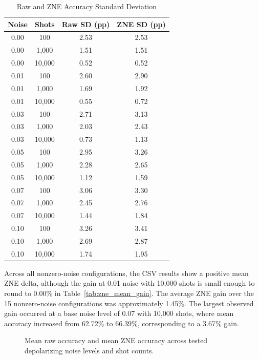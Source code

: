 \documentclass[conference]{IEEEtran}
\begin{document}
\begin{table}[H]
\caption{Raw and ZNE Accuracy Standard Deviation}
\label{tab:zne_standard_deviation}
\centering
\scriptsize
\renewcommand{\arraystretch}{1.35}
\setlength{\tabcolsep}{14pt}
\begin{tabular}{|c|c|c|c|}
\hline
\textbf{Noise} & \textbf{Shots} & \textbf{Raw SD (pp)} & \textbf{ZNE SD (pp)} \\
\hline
0.00 & 100    & 2.53 & 2.53 \\
\hline
0.00 & 1,000  & 1.51 & 1.51 \\
\hline
0.00 & 10,000 & 0.52 & 0.52 \\
\hline
0.01 & 100    & 2.60 & 2.90 \\
\hline
0.01 & 1,000  & 1.69 & 1.92 \\
\hline
0.01 & 10,000 & 0.55 & 0.72 \\
\hline
0.03 & 100    & 2.71 & 3.13 \\
\hline
0.03 & 1,000  & 2.03 & 2.43 \\
\hline
0.03 & 10,000 & 0.73 & 1.13 \\
\hline
0.05 & 100    & 2.95 & 3.26 \\
\hline
0.05 & 1,000  & 2.28 & 2.65 \\
\hline
0.05 & 10,000 & 1.12 & 1.59 \\
\hline
0.07 & 100    & 3.06 & 3.30 \\
\hline
0.07 & 1,000  & 2.45 & 2.76 \\
\hline
0.07 & 10,000 & 1.44 & 1.84 \\
\hline
0.10 & 100    & 3.26 & 3.41 \\
\hline
0.10 & 1,000  & 2.69 & 2.87 \\
\hline
0.10 & 10,000 & 1.74 & 1.95 \\
\hline
\end{tabular}
\end{table}

Across all nonzero-noise configurations, the CSV results
show a positive mean ZNE delta, although the gain at 0.01
noise with 10,000 shots is small enough to round to 0.00\%
in Table~\ref{tab:zne_mean_gain}. The average ZNE gain over the
15 nonzero-noise configurations was approximately 1.45\%. The largest
observed gain occurred at a base noise level of 0.07 with 10,000 shots,
where mean accuracy increased from 62.72\% to 66.39\%, corresponding
to a 3.67\% gain.

\begin{figure}[H]
\centering

\caption{Mean raw accuracy and mean ZNE accuracy across tested depolarizing noise levels and shot counts.}
\label{fig:raw_vs_zne_mean_accuracy}
\end{figure}
\end{document}
